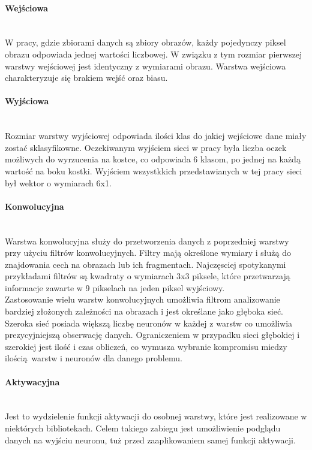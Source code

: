 \paragraph{Wejściowa}  \mbox{}\\
W pracy, gdzie zbiorami danych są zbiory obrazów, każdy pojedynczy piksel obrazu
odpowiada jednej wartości liczbowej. W związku z tym rozmiar pierwszej warstwy
wejściowej jest identyczny z wymiarami obrazu. Warstwa wejściowa charakteryzuje się
brakiem wejść oraz biasu.

\paragraph{Wyjściowa}  \mbox{}\\
Rozmiar warstwy wyjściowej odpowiada ilości klas do jakiej wejściowe dane miały
zostać sklasyfikowne. Oczekiwanym wyjściem sieci w pracy była liczba oczek możliwych
do wyrzucenia na kostce, co odpowiada 6 klasom, po jednej na każdą wartość na boku
kostki. Wyjściem wszystkkich przedstawianych w tej pracy sieci był wektor o wymiarach
6x1.

\paragraph{Konwolucyjna}  \mbox{}\\
Warstwa konwolucyjna służy do przetworzenia danych z poprzedniej warstwy przy użyciu
filtrów konwolucyjnych. Filtry mają określone wymiary i służą do znajdowania cech
na obrazach lub ich fragmentach. Najczęsciej spotykanymi przykładami filtrów są
kwadraty o wymiarach 3x3 piksele, które przetwarzają informacje zawarte w 9 pikselach
na jeden piksel wyjściowy.\\
Zastosowanie wielu warstw konwolucyjnych umożliwia filtrom analizowanie bardziej złożonych
zależności na obrazach i jest określane jako głęboka sieć. Szeroka sieć posiada większą
liczbę neuronów w każdej z warstw co umożliwia prezycyjniejszą obserwację danych.
Ograniczeniem w przypadku sieci głębokiej i szerokiej jest ilość i czas obliczeń, co
wymusza wybranie kompromisu miedzy ilością warstw i neuronów dla danego problemu.

\paragraph{Aktywacyjna}  \mbox{}\\
Jest to wydzielenie funkcji aktywacji do osobnej warstwy, które jest realizowane
w niektórych bibliotekach. Celem takiego zabiegu jest umożliwienie podglądu danych
na wyjściu neuronu, tuż przed zaaplikowaniem samej funkcji aktywacji.

